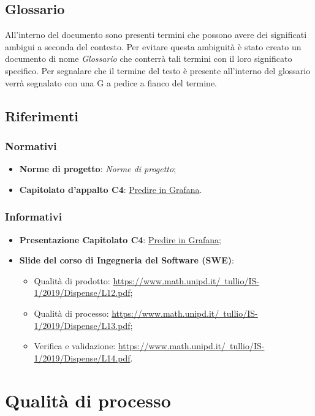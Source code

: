 \documentclass{article}
\begin{document}
\subsection{Glossario}%
\label{sub:glossario}
All'interno del documento sono presenti termini che possono avere dei significati ambigui a seconda del contesto. Per evitare questa ambiguità è stato creato un documento di nome \textit{Glossario} che conterrà tali termini con il loro significato specifico. Per segnalare che il termine del testo è presente all'interno del glossario verrà segnalato con una G a pedice a fianco del termine.

\subsection{Riferimenti}%
\label{sub:riferimenti}

\subsubsection{Normativi}%
\label{subs:normativi}
\begin{itemize}
    \item \textbf{Norme di progetto}: \textit{Norme di progetto};
    \item \textbf{Capitolato d'appalto C4}: \href{https://www.math.unipd.it/~tullio/IS-1/2019/Progetto/C4.pdf}{Predire in Grafana}.
\end{itemize}

\subsubsection{Informativi}%
\label{subs:informativi}
\begin{itemize}
    \item \textbf{Presentazione Capitolato C4}: \href{https://www.math.unipd.it/~tullio/IS-1/2019/Dispense/C4a.pdf}{Predire in Grafana};
    \item \textbf{Slide del corso di Ingegneria del Software (SWE)}:
    \begin{itemize}
        \item Qualità di prodotto: \href{https://www.math.unipd.it/~tullio/IS-1/2019/Dispense/L12.pdf}{https://www.math.unipd.it/~tullio/IS-1/2019/Dispense/L12.pdf};
        \item Qualità di processo: \href{https://www.math.unipd.it/~tullio/IS-1/2019/Dispense/L13.pdf}{https://www.math.unipd.it/~tullio/IS-1/2019/Dispense/L13.pdf};
        \item Verifica e validazione: \href{https://www.math.unipd.it/~tullio/IS-1/2019/Dispense/L14.pdf}{https://www.math.unipd.it/~tullio/IS-1/2019/Dispense/L14.pdf}.
    \end{itemize}
\end{itemize}

\newpage
\section{Qualità di processo}%
\label{sec:qualita_di_processo}

\end{document}
